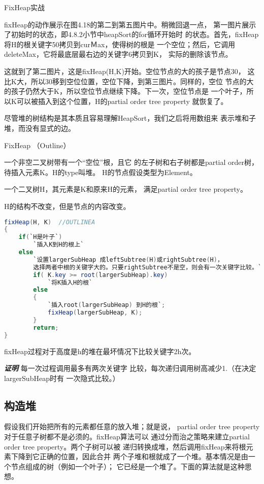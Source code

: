\begin{example}
FixHeap实战

fixHeap的动作展示在图4.18的第二到第五图片中。稍微回退一点，
第一图片展示了初始时的状态，即4.8.2小节中heapSort的for循环开始时
的状态。首先，fixHeap将H的根关键字50拷贝到curＭax，使得树的根是
一个空位；然后，它调用deleteMax，它将最底层最右边的关键字6拷贝到K，
实际的删除该节点。

这就到了第二图片，这是fixHeap(H,K)开始。空位节点的大的孩子是节点30，
这比K大，所以30移到空位位置，空位下降，到第三图片。同样的，空位
节点的大的孩子仍然大于K，所以空位节点继续下降。下一次，空位节点是
一个叶子，所以K可以被插入到这个位置，H的partial order tree property
就恢复了。
\end{example}

尽管堆的树结构是其本质且容易理解HeapSort，我们之后将用数组来
表示堆和子堆，而没有显式的边。

\begin{algorithm}
FixHeap （Outline）

一个非空二叉树带有一个“空位”根，且它
的左子树和右子树都是partial order树，待插入元素K。H的type叫堆。
H的节点假设类型为Element。

一个二叉树H，其元素是K和原来H的元素，
满足partial order tree property。

H的结构不改变，但是节点的内容改变。
\end{algorithm}
\begin{lstlisting}[language={Java}, keywordstyle=\color{blue!70}, commentstyle=\color{red!50!green!50!blue!50}]
fixHeap(H, K)  //OUTLINEA
{
    if(`H是叶子`)
        `插入K到H的根上`
    else
        `设置largerSubHeap 成leftSubtree(H)或rightSubtree(H)，
        选择两者中根的关键字大的。只要rightSubtree不是空，则会有一次关键字比较。`
        if( K.key >= root(largerSubHeap).key)
            `将K插入H的根`
        else
        {
            `插入root(largerSubHeap) 到H的根`;
            fixHeap(largerSubHeap, K);
        }
        return;
}
\end{lstlisting}

\begin{lemma}
fixHeap过程对于高度是h的堆在最坏情况下比较关键字2h次。

{\textbf{\emph{证明}}} 每一次过程调用最多有两次关键字
比较，每次递归调用树高减少1.（在决定largerSubHeap时有
一次隐式比较。）
\end{lemma}

\subsection{构造堆}
假设我们开始把所有的元素都任意的放入堆；就是说，
partial order tree property对于任意子树都不是必须的。fixHeap算法可以
通过分而治之策略来建立partial order tree property。两个子树可以被
递归转换成堆，然后调用fixHeap来将根元素下降到它正确的位置，因此合并
两个子堆和根就成了一个堆。基本情况是由一个节点组成的树（例如一个叶子）；
它已经是一个堆了。下面的算法就是这种思想。

